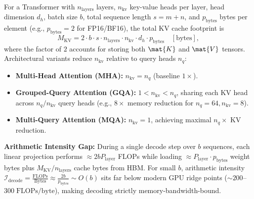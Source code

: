 \documentclass[../../../../master.tex]{subfiles}
\begin{document}
\begin{coremath}
For a Transformer with $n_{\mathrm{layers}}$ layers, $n_{\mathrm{kv}}$ key-value heads per layer, head dimension $d_h$, batch size $b$, total sequence length $s = m + n$, and $p_{\mathrm{bytes}}$ bytes per element (e.g., $p_{\mathrm{bytes}} = 2$ for FP16/BF16), the total KV cache footprint is
\begin{equation}\label{eq:decode:kv_memory}
  M_{\mathrm{KV}} = 2 \cdot b \cdot s \cdot n_{\mathrm{layers}} \cdot n_{\mathrm{kv}} \cdot d_h \cdot p_{\mathrm{bytes}} \quad [\text{bytes}],
\end{equation}
where the factor of $2$ accounts for storing both $\mat{K}$ and $\mat{V}$ tensors. Architectural variants reduce $n_{\mathrm{kv}}$ relative to query heads $n_q$:
\begin{itemize}
  \item \textbf{Multi-Head Attention (MHA):} $n_{\mathrm{kv}} = n_q$ (baseline $1\times$).
  \item \textbf{Grouped-Query Attention (GQA):} $1 < n_{\mathrm{kv}} < n_q$, sharing each KV head across $n_q / n_{\mathrm{kv}}$ query heads (e.g., $8\times$ memory reduction for $n_q=64, n_{\mathrm{kv}}=8$).
  \item \textbf{Multi-Query Attention (MQA):} $n_{\mathrm{kv}} = 1$, achieving maximal $n_q\times$ KV reduction.
\end{itemize}
\textbf{Arithmetic Intensity Gap:} During a single decode step over $b$ sequences, each linear projection performs $\approx 2 b P_{\mathrm{layer}}$ FLOPs while loading $\approx P_{\mathrm{layer}} \cdot p_{\mathrm{bytes}}$ weight bytes plus $M_{\mathrm{KV}} / n_{\mathrm{layers}}$ cache bytes from HBM. For small $b$, arithmetic intensity $\mathcal{I}_{\mathrm{decode}} = \frac{\mathrm{FLOPs}}{\mathrm{Bytes}} \approx \frac{2b}{p_{\mathrm{bytes}}} \sim O(b)$ sits far below modern GPU ridge points ($\sim 200$--$300\;\mathrm{FLOPs/byte}$), making decoding strictly memory-bandwidth-bound.
\end{coremath}
\end{document}

